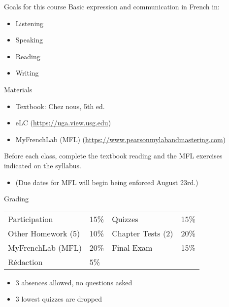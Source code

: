 \documentclass{beamer}
\begin{document}
  \begin{frame}{Goals for this course}
    Basic expression and communication in French in:
    \begin{itemize}
      \item Listening
      \item Speaking
      \item Reading
      \item Writing
    \end{itemize}
  \end{frame}

  \begin{frame}{Materials}
    \begin{itemize}
      \item Textbook: Chez nous, 5th ed.
      \item eLC (\url{https://uga.view.usg.edu})
      \item MyFrenchLab (MFL) (\url{https://www.pearsonmylabandmastering.com})
    \end{itemize}
    \alert{Before each class}, complete the textbook reading and the MFL exercises indicated on the syllabus.
    \begin{itemize}
      \item (Due dates for MFL will begin being enforced August 23rd.)
    \end{itemize}
  \end{frame}

  \begin{frame}{Grading}
    \begin{center}
      \begin{tabular}{l l | l l}
        Participation      & 15\% & Quizzes           & 15\% \\
        Other Homework (5) & 10\% & Chapter Tests (2) & 20\% \\
        MyFrenchLab (MFL)  & 20\% & Final Exam        & 15\% \\
        Rédaction          & 5\%  &                   &
      \end{tabular}
    \end{center}
    \begin{itemize}
      \item 3 absences allowed, no questions asked
      \item 3 lowest quizzes are dropped
    \end{itemize}
  \end{frame}
\end{document}
